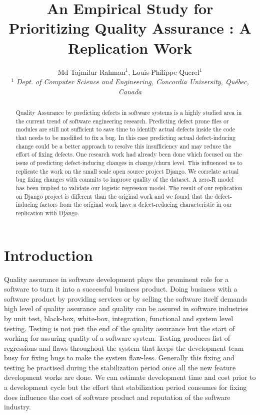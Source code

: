 \documentclass[10pt, conference]{IEEEtran}
\title{An Empirical Study for Prioritizing Quality Assurance : A Replication Work}
\author{Md Tajmilur Rahman$^{1}$, Louis-Philippe Querel$^{1}$
    \\
	\emph{$^{1}$ Dept. of Computer Science and Engineering, Concordia University, Qu\'{e}bec, Canada}
}
\begin{document}
\maketitle

\begin{abstract}
Quality Assurance by predicting defects in software systems is a highly studied area in the current trend of software engineering research. Predicting defect prone files or modules are still not sufficient to save time to identify actual defects inside the code that needs to be modified to fix a bug. In this case predicting actual defect-inducing change could be a better approach to resolve this insufficiency and may reduce the effort of fixing defects. One research work had already been done which focused on the issue of predicting defect-inducing changes in change/churn level. This influenced us to replicate the work on the small scale open source project Django. We correlate actual bug fixing changes with commits to improve quality of the dataset. A zero-R model has been implied to validate our logistic regression model. The result of our replication on Django project is different than the original work and we found that the defect-inducing factors from the original work have a defect-reducing characteristic in our replication with Django.

\end{abstract}

\section{Introduction}
\label{sec:introduction}

Quality assurance in software development plays the prominent role for a software to turn it into a successful business product. Doing business with a software product by providing services or by selling the software itself demands high level of quality assurance and quality can be assured in software industries by unit test, black-box, white-box, integration, functional and system level testing. Testing is not just the end of the quality assurance but the start of working for assuring quality of a software system. Testing produces list of regressions and flaws throughout the system that keeps the development team busy for fixing bugs to make the system flaw-less. Generally this fixing and testing be practised during the stabilization period once all the new feature development works are done. We can estimate development time and cost prior to a development cycle but the effort that stabilization period consumes for fixing does influence the cost of software product and reputation of the software industry.
\end{document}
